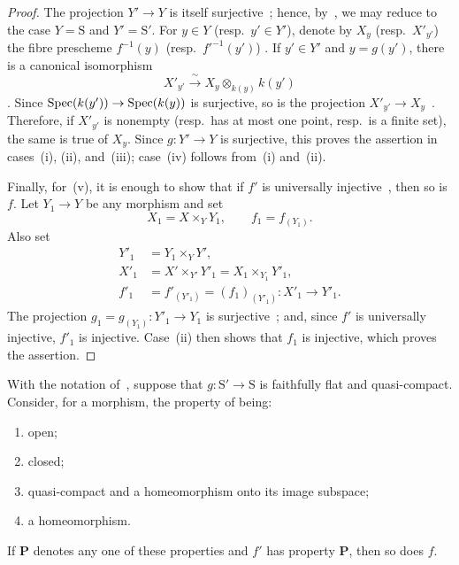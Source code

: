 \begin{proof}
The projection $Y'\to Y$ is itself surjective~;
hence, by~, we may reduce to the case
$Y=\mathrm{S}$ and $Y'=\mathrm{S}'$. For $y\in Y$
\textnormal{(}resp.\ $y'\in Y'$\textnormal{)}, denote by $X_y$
\textnormal{(}resp.\ $X'_{y'}$\textnormal{)} the fibre prescheme
$f^{-1}(y)$ \textnormal{(}resp.\ $f'^{-1}(y')$\textnormal{)}
. If $y'\in Y'$ and $y=g(y')$, there is a canonical
isomorphism
\[
  X'_{y'}\xrightarrow{\;\sim\;}
  X_y\otimes_{k(y)}k(y')
\]
. Since
$\operatorname{Spec}(k(y'))\to\operatorname{Spec}(k(y))$ is surjective, so is the projection
$X'_{y'}\to X_y$~. Therefore, if $X'_{y'}$ is
nonempty \textnormal{(}resp.\ has at most one point, resp.\ is a finite
set\textnormal{)}, the same is true of $X_y$. Since $g:Y'\to Y$ is
surjective, this proves the assertion in cases~(i), (ii), and~(iii);
case~(iv) follows from~(i) and~(ii).

Finally, for~(v), it is enough to show that if $f'$ is universally
injective~, then so is $f$. Let $Y_1\to Y$ be any
morphism and set
\[
  X_1=X\times_Y Y_1,\qquad f_1=f_{(Y_1)}.
\]
Also set
\[
\begin{aligned}
  Y'_1&=Y_1\times_Y Y',\\
  X'_1&=X'\times_{Y'}Y'_1=X_1\times_{Y_1}Y'_1,\\
  f'_1&=f'_{(Y'_1)}=(f_1)_{(Y'_1)}:X'_1\to Y'_1.
\end{aligned}
\]
The projection $g_1=g_{(Y_1)}:Y'_1\to Y_1$ is
surjective~; and, since $f'$ is universally injective,
$f'_1$ is injective. Case~(ii) then shows that $f_1$ is injective,
which proves the assertion.
\end{proof}

\begin{proposition}[2.6.2]
\label{IV.2.6.2}
With the notation of~, suppose that
$g:\mathrm{S}'\to\mathrm{S}$ is faithfully flat and quasi-compact.
Consider, for a morphism, the property of being:
\begin{enumerate}
  \item[(i)] open;
  \item[(ii)] closed;
  \item[(iii)] quasi-compact and a homeomorphism onto its image
    subspace;
  \item[(iv)] a homeomorphism.
\end{enumerate}
If $\mathbf{P}$ denotes any one of these properties and $f'$ has
property $\mathbf{P}$, then so does $f$.
\end{proposition}

